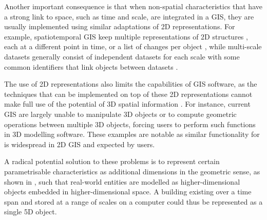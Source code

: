 
Another important consequence is that when non-spatial characteristics that have a strong link to space, such as time and scale, are integrated in a GIS, they are usually implemented using similar adaptations of 2D representations.
For example, spatiotemporal GIS keep multiple representations of 2D structures \citep{Armstrong88}, each at a different point in time, or a list of changes per object \citep{Worboys92,Peuquet94}, while multi-scale datasets generally consist of independent datasets for each scale with some common identifiers that link objects between datasets \citep{Friis-Christensen03,Stoter14}.


The use of 2D representations also limits the capabilities of GIS software, as the techniques that can be implemented on top of these 2D representations cannot make full use of the potential of 3D spatial information \citep[Ch.~3]{Zlatanova00}.
For instance, current GIS are largely unable to manipulate 3D objects or to compute geometric operations between multiple 3D objects, forcing users to perform such functions in 3D modelling software.
These examples are notable as similar functionality for is widespread in 2D GIS and expected by users.


A radical potential solution to these problems is to represent certain parametrisable characteristics as additional dimensions in the geometric sense, as shown in , such that real-world entities are modelled as higher-dimensional objects embedded in higher-dimensional space.
A building existing over a time span and stored at a range of scales on a computer could thus be represented as a single 5D object.

